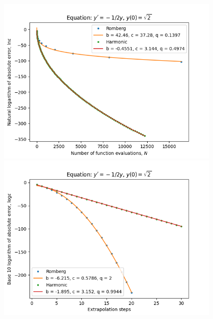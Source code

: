 \begin{figure}[H]
\centering
\begin{minipage}{0.45\textwidth}
\centering
\includegraphics[scale=0.45]{emr_plots/quad_sing_0_hp_trend.png}
\end{minipage}
\begin{minipage}{0.45\textwidth}
\centering
\includegraphics[scale=0.45]{emr_plots/quad_sing_0_hp_steps.png}
\end{minipage}
\end{figure}

